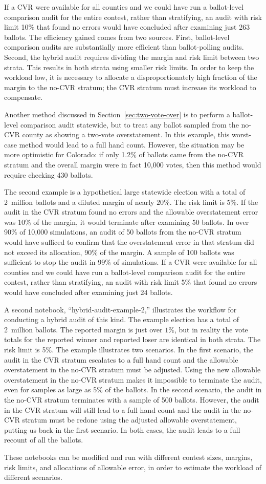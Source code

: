 \documentclass[12pt]{article}
\begin{document}
If a CVR were available for all counties and we could have run a ballot-level comparison audit for the entire contest, 
rather than stratifying, an audit with risk limit 10\% that found no errors would have concluded after examining just 263 ballots.
The efficiency gained comes from two sources.
First, ballot-level comparison audits are substantially more efficient than ballot-polling audits.
Second, the hybrid audit requires dividing the margin and risk limit between two strata.
This results in both strata using smaller risk limits.
In order to keep the workload low, it is necessary to allocate a disproportionately high fraction of the margin
to the no-CVR stratum;
the CVR stratum must increase its workload to compensate.

Another method discussed in Section~\ref{sec:two-vote-over} is to perform a ballot-level comparison audit statewide,
but to treat any ballot sampled from the no-CVR county as showing a two-vote overstatement.
In this example, this worst-case method would lead to a full hand count.
However, the situation may be more optimistic for Colorado:
if only 1.2\% of ballots came from the no-CVR stratum and the overall margin were in fact 10,000 votes,
then this method would require checking 430 ballots.

The second example is a hypothetical large statewide election with a total of 
2~million ballots and a diluted margin of nearly $20\%$.  The risk limit is 5\%.
If the audit in the CVR stratum found no errors and the allowable overstatement error was 10\% of the margin, 
it would terminate after examining 50 ballots.
In over 90\% of 10,000 simulations, an audit of 50 ballots from the no-CVR stratum
would have sufficed to confirm that the overstatement error in that stratum
did not exceed its allocation, 90\% of the margin.
A sample of 100 ballots was sufficient to stop the audit in 99\% of simulations.
If a CVR were available for all counties and we could have run a ballot-level comparison audit for the entire contest, 
rather than stratifying, an audit with risk limit 5\% that found no errors would have concluded after examining just 24 ballots.

A second notebook, ``hybrid-audit-example-2,'' illustrates the workflow for conducting a hybrid audit of this kind.
The example election has a total of 2~million ballots.
The reported margin is just over $1\%$, but in reality the vote totals for the reported winner
and reported loser are identical in both strata.  The risk limit is 5\%.
The example illustrates two scenarios.
In the first scenario, the audit in the CVR stratum escalates to a full hand count and the allowable overstatement
in the no-CVR stratum must be adjusted.
Using the new allowable overstatement in the no-CVR stratum makes it impossible to terminate the audit,
even for samples as large as 5\% of the ballots.
In the second scenario, the audit in the no-CVR stratum terminates with a sample of 500 ballots.
However, the audit in the CVR stratum will still lead to a full hand count and the audit in the no-CVR
stratum must be redone using the adjusted allowable overstatement, putting us back in the first scenario.
In both cases, the audit leads to a full recount of all the ballots.

These notebooks can be modified and run with different contest sizes, margins, risk limits, and allocations of allowable error, in order to
estimate the workload of different scenarios.


\end{document}
